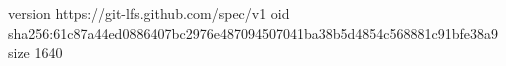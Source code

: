 version https://git-lfs.github.com/spec/v1
oid sha256:61c87a44ed0886407bc2976e487094507041ba38b5d4854c568881c91bfe38a9
size 1640
